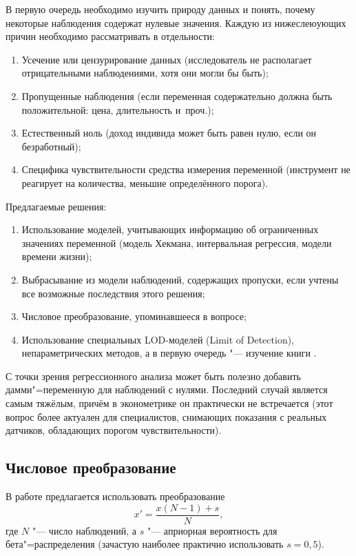 \documentclass[final,pdftex]{../../template/epsilonj}
\begin{document}
В первую очередь необходимо изучить природу данных и понять, почему некоторые наблюдения содержат нулевые значения. Каждую из нижеслеюующих причин необходимо рассматривать в отдельности:
\begin{enumerate}
	\item Усечение или цензурирование данных (исследователь не располагает отрицательными наблюдениями, хотя они могли бы быть);
	\item Пропущенные наблюдения (если переменная содержательно должна быть положительной: цена, длительность и~проч.);
	\item Естественный ноль (доход индивида может быть равен нулю, если он безработный);
	\item Специфика чувствительности средства измерения переменной (инструмент не реагирует на количества, меньшие определённого порога).
\end{enumerate}

Предлагаемые решения:
\begin{enumerate}
	\item Использование моделей, учитывающих информацию об ограниченных значениях переменной (модель Хекмана, интервальная регрессия, модели времени жизни);
	\item Выбрасывание из модели наблюдений, содержащих пропуски, если учтены все возможные последствия этого решения;
	\item Числовое преобразование, упоминавшееся в вопросе;
	\item Использование специальных LOD-моделей (Limit of Detection), непараметрических методов, а в первую очередь "--- изучение книги \cite{nondetect05}.
\end{enumerate}

С точки зрения регрессионного анализа может быть полезно добавить дамми"=переменную для наблюдений с нулями. Последний случай является самым тяжёлым, причём в эконометрике он практически не встречается (этот вопрос более актуален для специалистов, снимающих показания с реальных датчиков, обладающих порогом чувствительности).

\subsection{Числовое преобразование}

В работе \cite{squeezer06} предлагается использовать преобразование 
\[
x' = \frac{x(N-1) + s}{N},
\]
где $N$ "--- число наблюдений, а $s$ "--- априорная вероятность для бета"=распределения (зачастую наиболее практично использовать $s=0{,}5$).

\printbibliography
\end{document}
